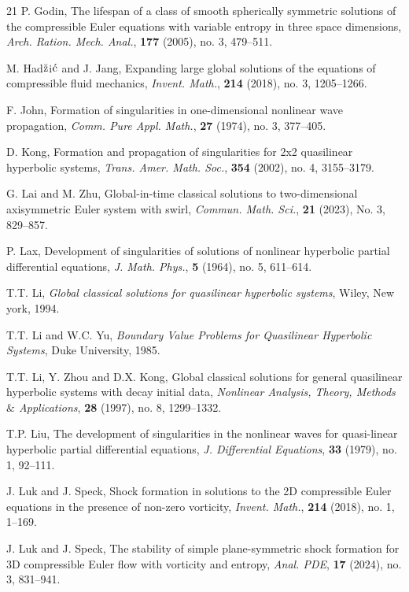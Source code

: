 \documentclass[11pt,reqno]{article}
\numberwithin{equation}{section}
\begin{document}
\begin{thebibliography}{21}
 P. Godin, The lifespan of a class of smooth spherically symmetric solutions of the
    compressible Euler equations with variable entropy in three space dimensions, \emph{Arch. Ration. Mech. Anal.}, {\bf 177} (2005), no. 3, 479--511.

 M. Had${\rm \breve{z}}$i${\rm \acute{c}}$ and J. Jang, Expanding large global solutions of the equations of compressible fluid mechanics, \emph{Invent. Math.}, {\bf 214} (2018), no. 3, 1205--1266.

 F. John, Formation of singularities in one-dimensional nonlinear wave propagation,  \emph{Comm. Pure Appl. Math.}, {\bf 27} (1974), no. 3, 377--405.

 D. Kong, Formation and propagation of singularities for 2x2 quasilinear hyperbolic systems, \emph{Trans. Amer. Math. Soc.}, {\bf 354} (2002), no. 4, 3155--3179.

 G. Lai and M. Zhu, Global-in-time classical solutions to two-dimensional axisymmetric
    Euler system with swirl, \emph{Commun. Math. Sci.}, {\bf 21} (2023), No. 3, 829--857.

 P. Lax, Development of singularities of solutions of nonlinear hyperbolic partial differential equations, \emph{J. Math. Phys.}, {\bf 5} (1964), no. 5, 611--614.

 T.T. Li, \emph{Global classical solutions for quasilinear hyperbolic systems}, Wiley, New york, 1994.

 T.T. Li and W.C. Yu, \emph{Boundary Value Problems for Quasilinear Hyperbolic
    Systems}, Duke University, 1985.

 T.T. Li, Y. Zhou and D.X. Kong, Global classical solutions for general quasilinear hyperbolic systems with decay initial data, \emph{Nonlinear Analysis, Theory, Methods $\&$ Applications}, {\bf 28} (1997), no. 8, 1299--1332.

 T.P. Liu, The development of singularities in the nonlinear waves for quasi-linear hyperbolic partial differential equations, \emph{J. Differential Equations}, {\bf 33} (1979), no. 1, 92--111.

 J. Luk and J. Speck, Shock formation in solutions to the 2D compressible Euler
    equations in the presence of non-zero vorticity, \emph{Invent. Math.}, {\bf 214} (2018), no. 1, 1--169.

 J. Luk and J. Speck, The stability of simple plane-symmetric shock formation for 3D
    compressible Euler flow with vorticity and entropy, \emph{Anal. PDE}, {\bf 17} (2024), no. 3, 831--941.


\end{thebibliography}
\end{document}
